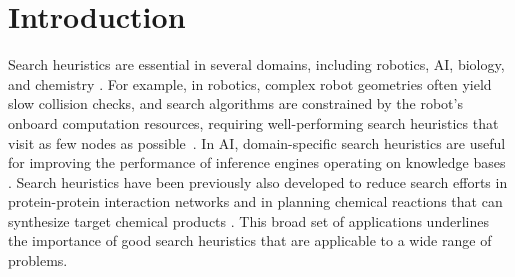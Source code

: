 \section{Introduction}
\label{sec:intro}



Search heuristics are essential in several domains, including robotics, AI, biology, and chemistry \cite{bhardwaj2017learning, chen2020retro, gebser2013domain, mac2016heuristic, sharma2017identifying, yeh2012pathway}. For example, in robotics, complex robot geometries often yield slow collision checks, and search algorithms are constrained by the robot's onboard computation resources, requiring well-performing search heuristics that visit as few nodes as possible~\cite{bhardwaj2017learning, mac2016heuristic}. In AI, domain-specific search heuristics are useful for improving the performance of inference engines operating on knowledge bases \cite{gebser2013domain, sharma2017identifying}. Search heuristics have been previously also developed to reduce search efforts in protein-protein interaction networks \cite{yeh2012pathway} and in planning chemical reactions that can synthesize target chemical products \cite{chen2020retro}. This broad set of applications underlines the importance of good search heuristics that are applicable to a wide range of problems. 


